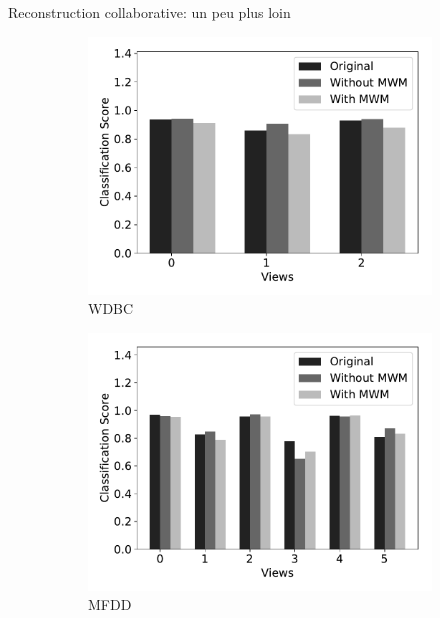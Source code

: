 \documentclass[hyperref={pdfpagelabels=false}]{beamer}
\begin{document}
    \begin{frame}{Reconstruction collaborative: un peu plus loin}
        \begin{figure}[!h]
            \centering
            \begin{subfigure}[c]{0.32\textwidth}
                \includegraphics[scale=.22]{cs_wdbc}
                \caption{WDBC}
            \end{subfigure}
            \begin{subfigure}[c]{0.32\textwidth}
                \includegraphics[scale=.22]{cs_mfeat}
                \caption{MFDD}
            \end{subfigure}
            \begin{subfigure}[c]{0.32\textwidth}

\end{subfigure}
\end{figure}
\end{frame}
\end{document}
